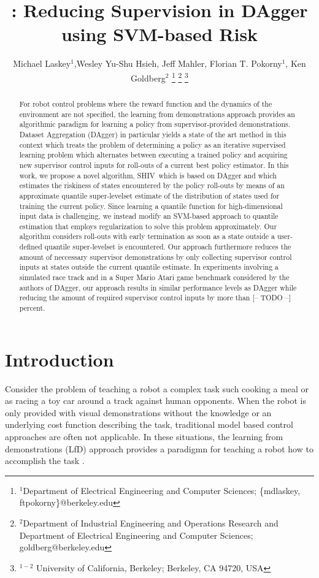 \documentclass[10pt, conference]{ieeeconf}      %
\title{\LARGE \bf \acro: Reducing Supervision in DAgger using SVM-based Risk }
\author{Michael Laskey$^1$,Wesley Yu-Shu Hsieh, Jeff Mahler, Florian T. Pokorny$^1$, Ken Goldberg$^2$%
\thanks{$^1$Department of Electrical Engineering and Computer Sciences; {\small \{mdlaskey, ftpokorny\}@berkeley.edu}}%
\thanks{$^2$Department of Industrial Engineering and Operations Research and Department of Electrical Engineering and Computer Sciences; {\small goldberg@berkeley.edu}}%
\thanks{$^{1-2}$ University of California, Berkeley;  Berkeley, CA 94720, USA}%
}
\newcommand{\acro}{SHIV}
\begin{document}
\maketitle
\thispagestyle{empty}
\pagestyle{empty}



\begin{abstract}
For robot control problems where the reward function  and the dynamics of the environment are not specified, the
learning from demonstrations approach provides an algorithmic paradigm for learning a policy from supervisor-provided
demonstrations. Dataset Aggregation (DAgger) in particular yields a state of the art method in this context which treats
the problem of determining a policy as an iterative supervised learning problem which alternates between executing a
trained policy and acquiring new supervisor control inputs for roll-outs of a current best policy estimator. In this
work, we propose a novel algorithm, \acro~which is based on DAgger and which estimates the riskiness of states
encountered by the policy roll-outs by means of an approximate quantile super-levelset estimate of the distribution of
states used for training the current policy. Since learning a quantile function for high-dimensional input data is
challenging, we instead modify an SVM-based approach to quantile estimation that employs regularization to solve this
problem approximately. Our algorithm considers roll-outs with early termination as soon as a state outside a
user-defined quantile super-levelset is encountered. Our approach furthermore reduces the amount of neccessary
supervisor demonstrations by only collecting supervisor control inputs at states outside the current quantile estimate.
In experiments involving a simulated race track and in a Super Mario Atari game benchmark considered by the authors of
DAgger, our approach results in similar performance levels as DAgger while reducing the amount of required supervisor
control inputs by more than {\color{blue}[-- TODO --]} percent.
\end{abstract}



\section{Introduction} 
Consider the problem of teaching a robot a complex task such cooking a meal or as racing a toy car around a track
against human opponents. When the robot is only provided with visual demonstrations without the knowledge or an
underlying cost function describing the task, traditional model based control approaches are often not applicable. In
these situations, the learning from demonstrations (LfD) approach provides a paradigmn for teaching a robot how to
accomplish the task \cite{ross2013learning,pomerleau1989alvinn,schulman2013case}.
\end{document}
